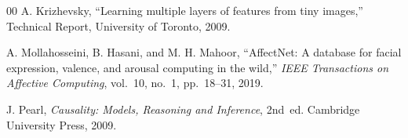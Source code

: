 \documentclass[conference]{IEEEtran}
\begin{document}
\begin{thebibliography}{00}
A. Krizhevsky,
``Learning multiple layers of features from tiny images,''
Technical Report, University of Toronto, 2009.

A. Mollahosseini, B. Hasani, and M. H. Mahoor,
``AffectNet: A database for facial expression, valence, and arousal computing in the wild,''
\textit{IEEE Transactions on Affective Computing}, vol.~10, no.~1, pp.~18--31, 2019.

J. Pearl,
\textit{Causality: Models, Reasoning and Inference}, 2nd~ed.
Cambridge University Press, 2009.

\end{thebibliography}
\end{document}

